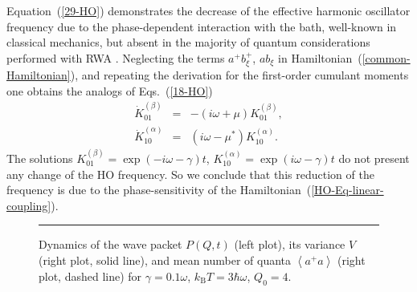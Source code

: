 \documentclass[12pt,twoside,a4paper]{report}
\begin{document}


\noindent
Equation~(\ref{29-HO}) demonstrates the decrease of the effective harmonic
oscillator frequency due to the phase-dependent interaction with the
bath, %
well-known in classical mechanics, but absent in the majority of
quantum considerations performed with RWA \cite{13,loui64,puri77,plen98,fari99,vita99}.
Neglecting the terms $a^+b_\xi^+$, $ab_\xi$ in Hamiltonian~(\ref{common-Hamiltonian}), and
repeating the derivation for the first-order cumulant moments one obtains 
the analogs of Eqs.~(\ref{18-HO})
\begin{eqnarray} 
      \dot{K}_{01}^{(\beta )} 
             &=& -  \left( 
                        {{i}}\omega +  \mu   \right) K_{01}^{(\beta)},
\nonumber \\ 
      \dot{K}_{10}^{(\alpha )} 
             &=&     \left( 
                         {{i}}\omega - \mu ^{*} \right) K_{10}^{(\alpha)}.
\label{RWA-cumulants-first}
\end{eqnarray}
The  solutions  
${K}_{01}^{(\beta )}=\exp{(-{{i}}\omega-\gamma)t}$,
${K}_{10}^{(\alpha)}=\exp{( {{i}}\omega-\gamma)t}$
do not present any change of the HO frequency.
So we conclude that this reduction of the frequency 
is due to the phase-sensitivity of the Hamiltonian~(\ref{HO-Eq-linear-coupling}).

\footnotesize\begin{figure}[!h]\centering
  \parbox{10cm}
  {\rule{-3cm}{0cm}\epsfxsize=16cm}
\caption[Dynamics of the wave packet]
{\small Dynamics of the wave packet $P\left( Q,t\right) $ (left plot),
  its variance $V$(right plot, solid line), and mean number of quanta $\left<a^+a\right>$ 
  (right plot, dashed line) for $\gamma =0.1\omega$, $
  k_{\mathrm{B}}T=3\hbar \omega$, $Q_0=4$.
\label{single-wave-packet}
}
\end{figure}\normalsize
\end{document}
